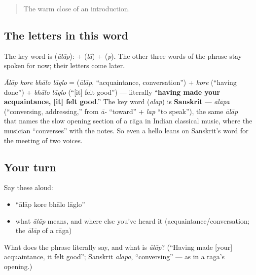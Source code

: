 \label{lesson:BN-C02-alaap}



\begin{quote}
The warm close of an introduction.
\end{quote}

\subsection*{The letters in this word}
The key word is \textbf{} (\emph{ālāp}): \textbf{} + \textbf{} (\emph{lā}) + \textbf{} (\emph{p}). The other three words of the phrase stay spoken for now; their letters come later.

\begin{cousinweb}
\emph{Ālāp kore bhālo lāglo} = \textbf{} (\emph{ālāp}, \textquotedblleft{}acquaintance, conversation\textquotedblright{}) + \emph{kore} (\textquotedblleft{}having done\textquotedblright{}) + \emph{bhālo lāglo} (\textquotedblleft{}{[}it{]} felt good\textquotedblright{}) — literally \textquotedblleft{}\textbf{having made your acquaintance, {[}it{]} felt good}.\textquotedblright{} The key word \textbf{} (\emph{ālāp}) is \textbf{Sanskrit} — \emph{ālāpa} (\textquotedblleft{}conversing, addressing,\textquotedblright{} from \emph{ā-} \textquotedblleft{}toward\textquotedblright{} + \emph{lap} \textquotedblleft{}to speak\textquotedblright{}), the same \emph{ālāp} that names the slow opening section of a rāga in Indian classical music, where the musician \textquotedblleft{}converses\textquotedblright{} with the notes. So even a hello leans on Sanskrit's word for the meeting of two voices.
\end{cousinweb}

\subsection*{Your turn}
Say these aloud:

\begin{itemize}
\raggedright
  \item \textquotedblleft{}ālāp kore bhālo lāglo\textquotedblright{}
  \item what \emph{ālāp} means, and where else you've heard it (acquaintance/conversation; the \emph{ālāp} of a rāga)
\end{itemize}

\begin{tcolorbox}[breakable,colback=teal!4,colframe=teal!35!black,title={Before you move on}]
What does the phrase literally say, and what is \emph{ālāp}? (\textquotedblleft{}Having made {[}your{]} acquaintance, it felt good\textquotedblright{}; Sanskrit \emph{ālāpa}, \textquotedblleft{}conversing\textquotedblright{} — as in a rāga's opening.)
\end{tcolorbox}
